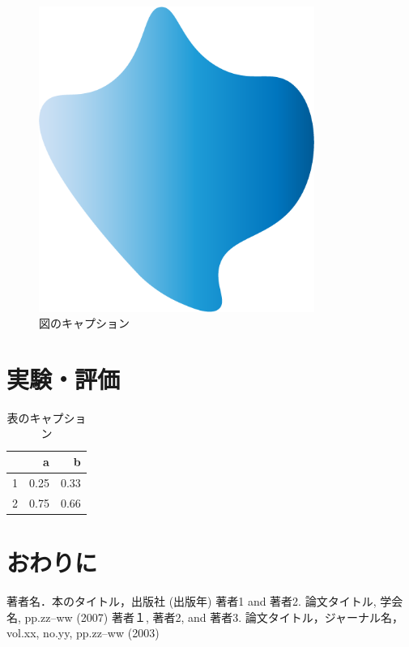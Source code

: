 \documentclass[12pt,a4j]{jreport}
\begin{document}
\begin{figure}[h]
\centering
\includegraphics[width=90mm]{image/icon.png}
\caption{図のキャプション}\label{fig1}
\end{figure}

\chapter{実験・評価}
\begin{table}[h]
\centering
\begin{tabular}{r|rr}
& a & b\\ \hline
1& 0.25 & 0.33\\
2& 0.75 & 0.66\\
\end{tabular}
\caption{表のキャプション}\label{table1}
\end{table}

\chapter{おわりに}

\renewcommand{\bibname}{参考文献}
\begin{thebibliography}{99}
 著者名．本のタイトル，出版社 (出版年)
 著者1 and 著者2. 論文タイトル, 学会名, pp.zz--ww (2007)
 著者１, 著者2, and 著者3. 論文タイトル，ジャーナル名，vol.xx, no.yy, pp.zz--ww (2003)
\end{thebibliography}
\end{document}
